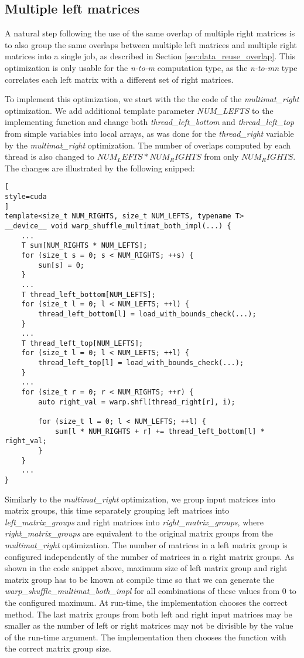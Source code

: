 \subsection{Multiple left matrices}
\label{sec:multimat_both}

A natural step following the use of the same overlap of multiple right matrices is to also group the same overlaps between multiple left matrices and multiple right matrices into a single job, as described in Section \ref{sec:data_reuse_overlap}. This optimization is only usable for the \textit{n-to-m} computation type, as the \textit{n-to-mn} type correlates each left matrix with a different set of right matrices.

To implement this optimization, we start with the the code of the \textit{multimat\_right} optimization. We add additional template parameter \textit{NUM\_LEFTS} to the implementing function and change both \textit{thread\_left\_bottom} and \textit{thread\_left\_top} from simple variables into local arrays, as was done for the \textit{thread\_right} variable by the \textit{multimat\_right} optimization. The number of overlaps computed by each thread is also changed to $NUM_LEFTS * NUM_RIGHTS$ from only $NUM_RIGHTS$. The changes are illustrated by the following snipped: 

\begin{lstlisting}[
style=cuda
]
template<size_t NUM_RIGHTS, size_t NUM_LEFTS, typename T>
__device__ void warp_shuffle_multimat_both_impl(...) {
	...
	T sum[NUM_RIGHTS * NUM_LEFTS];
	for (size_t s = 0; s < NUM_RIGHTS; ++s) {
		sum[s] = 0;
	}
	...
	T thread_left_bottom[NUM_LEFTS];
	for (size_t l = 0; l < NUM_LEFTS; ++l) {
		thread_left_bottom[l] = load_with_bounds_check(...);
	}
	...
	T thread_left_top[NUM_LEFTS];
	for (size_t l = 0; l < NUM_LEFTS; ++l) {
		thread_left_top[l] = load_with_bounds_check(...);
	}
	...
	for (size_t r = 0; r < NUM_RIGHTS; ++r) {
		auto right_val = warp.shfl(thread_right[r], i);
		
		for (size_t l = 0; l < NUM_LEFTS; ++l) {
			sum[l * NUM_RIGHTS + r] += thread_left_bottom[l] * right_val;
		}
	}
	...
}
\end{lstlisting}

Similarly to the \textit{multimat\_right} optimization, we group input matrices into matrix groups, this time separately grouping left matrices into \textit{left\_matrix\_groups} and right matrices into \textit{right\_matrix\_groups}, where \textit{right\_matrix\_groups} are equivalent to the original matrix groups from the \textit{multimat\_right} optimization. The number of matrices in a left matrix group is configured independently of the number of matrices in a right matrix groups. As shown in the code snippet above, maximum size of left matrix group and right matrix group has to be known at compile time so that we can generate the \textit{warp\_shuffle\_multimat\_both\_impl} for all combinations of these values from 0 to the configured maximum. At run-time, the implementation chooses the correct method. The last matrix groups from both left and right input matrices may be smaller as the number of left or right matrices may not be divisible by the value of the run-time argument. The implementation then chooses the function with the correct matrix group size.

